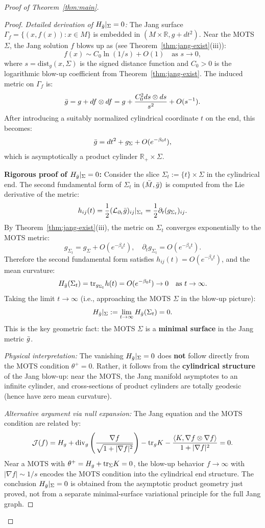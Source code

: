 \begin{proof}[Proof of Theorem~\ref{thm:main}]
\begin{proof}
\textit{Detailed derivation of $H_{\bar{g}}|_\Sigma = 0$:}
The Jang surface $\Gamma_f = \{(x, f(x)) : x \in M\}$ is embedded in $(M \times \mathbb{R}, g + dt^2)$. Near the MOTS $\Sigma$, the Jang solution $f$ blows up as (see Theorem~\ref{thm:jang-exist}(iii)):
\[
f(x) \sim C_0 \ln(1/s) + O(1) \quad \text{as } s \to 0,
\]
where $s = \mathrm{dist}_g(x, \Sigma)$ is the signed distance function and $C_0>0$ is the logarithmic blow-up coefficient from Theorem~\ref{thm:jang-exist}. The induced metric on $\Gamma_f$ is:
\[
\bar{g} = g + df \otimes df = g + \frac{C_0^2 ds \otimes ds}{s^2} + O(s^{-1}).
\]
After introducing a suitably normalized cylindrical coordinate $t$ on the end, this becomes:
\[
\bar{g} = dt^2 + g_\Sigma + O(e^{-\beta_0 t}),
\]
which is asymptotically a product cylinder $\mathbb{R}_+ \times \Sigma$.

\textbf{Rigorous proof of $H_{\bar{g}}|_\Sigma = 0$:}
Consider the slice $\Sigma_t := \{t\} \times \Sigma$ in the cylindrical end. The second fundamental form of $\Sigma_t$ in $(\bar{M}, \bar{g})$ is computed from the Lie derivative of the metric:
\[
h_{ij}(t) = \frac{1}{2}(\mathcal{L}_{\partial_t} \bar{g})_{ij}|_{\Sigma_t} = \frac{1}{2}\partial_t (g_{\Sigma_t})_{ij}.
\]
By Theorem~\ref{thm:jang-exist}(iii), the metric on $\Sigma_t$ converges exponentially to the MOTS metric:
\[
g_{\Sigma_t} = g_\Sigma + O(e^{-\beta_0 t}), \quad \partial_t g_{\Sigma_t} = O(e^{-\beta_0 t}).
\]
Therefore the second fundamental form satisfies $h_{ij}(t) = O(e^{-\beta_0 t})$, and the mean curvature:
\[
H_{\bar{g}}(\Sigma_t) = \mathrm{tr}_{g_{\Sigma_t}} h(t) = O(e^{-\beta_0 t}) \to 0 \quad \text{as } t \to \infty.
\]
Taking the limit $t \to \infty$ (i.e., approaching the MOTS $\Sigma$ in the blow-up picture):
\begin{equation}\label{eq:hbg-sigma-zero}
H_{\bar{g}}|_\Sigma := \lim_{t \to \infty} H_{\bar{g}}(\Sigma_t) = 0.
\end{equation}
This is the key geometric fact: the MOTS $\Sigma$ is a \textbf{minimal surface} in the Jang metric $\bar{g}$.

\textit{Physical interpretation:} The vanishing $H_{\bar{g}}|_\Sigma = 0$ does \textbf{not} follow directly from the MOTS condition $\theta^+ = 0$. Rather, it follows from the \textbf{cylindrical structure} of the Jang blow-up: near the MOTS, the Jang manifold asymptotes to an infinite cylinder, and cross-sections of product cylinders are totally geodesic (hence have zero mean curvature).

\textit{Alternative argument via null expansion:}
The Jang equation and the MOTS condition are related by:
\[
\mathcal{J}(f) = H_g + \mathrm{div}_g\left(\frac{\nabla f}{\sqrt{1+|\nabla f|^2}}\right) - \mathrm{tr}_g K - \frac{\langle K, \nabla f \otimes \nabla f\rangle}{1 + |\nabla f|^2} = 0.
\]
Near a MOTS with $\theta^+ = H_g + \mathrm{tr}_\Sigma K = 0$, the blow-up behavior $f \to \infty$ with $|\nabla f| \sim 1/s$ encodes the MOTS condition into the cylindrical end structure. The conclusion $H_{\bar{g}}|_\Sigma = 0$ is obtained from the asymptotic product geometry just proved, not from a separate minimal-surface variational principle for the full Jang graph.


\end{proof}
\end{proof}
